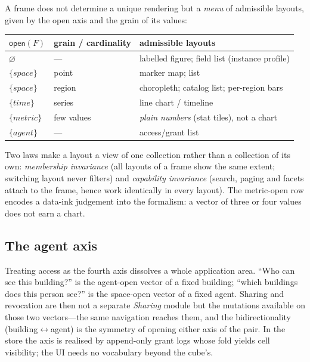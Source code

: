 \documentclass[11pt,a4paper]{article}
\theoremstyle{remark}
\newcommand{\open}{\mathsf{open}}
\begin{document}
A frame does not determine a unique rendering but a \emph{menu} of admissible
layouts, given by the open axis and the grain of its values:

\begin{center}
\begin{tabular}{lll}
$\open(F)$ & grain / cardinality & admissible layouts \\
\hline
$\varnothing$            & ---            & labelled figure; field list (instance profile) \\
$\{\mathit{space}\}$     & point          & marker map; list \\
$\{\mathit{space}\}$     & region         & choropleth; catalog list; per-region bars \\
$\{\mathit{time}\}$      & series         & line chart / timeline \\
$\{\mathit{metric}\}$    & few values     & \emph{plain numbers} (stat tiles), not a chart \\
$\{\mathit{agent}\}$     & ---            & access/grant list \\
\end{tabular}
\end{center}

Two laws make a layout a view of one collection rather than a collection of its own:
\emph{membership invariance} (all layouts of a frame show the same extent; switching
layout never filters) and \emph{capability invariance} (search, paging and facets
attach to the frame, hence work identically in every layout). The metric-open row
encodes a data-ink judgement into the formalism: a vector of three or four values
does not earn a chart.

\subsection{The agent axis}\label{sec:agentaxis}

Treating access as the fourth axis dissolves a whole application area. ``Who can
see this building?'' is the agent-open vector of a fixed building; ``which
buildings does this person see?'' is the space-open vector of a fixed agent.
Sharing and revocation are then not a separate \emph{Sharing} module but the
mutations available on those two vectors---the same navigation reaches them, and
the bidirectionality (building${}\leftrightarrow{}$agent) is the symmetry of
opening either axis of the pair. In the store the axis is realised by append-only
grant logs whose fold yields cell visibility; the UI needs no vocabulary beyond the
cube's.
\end{document}
